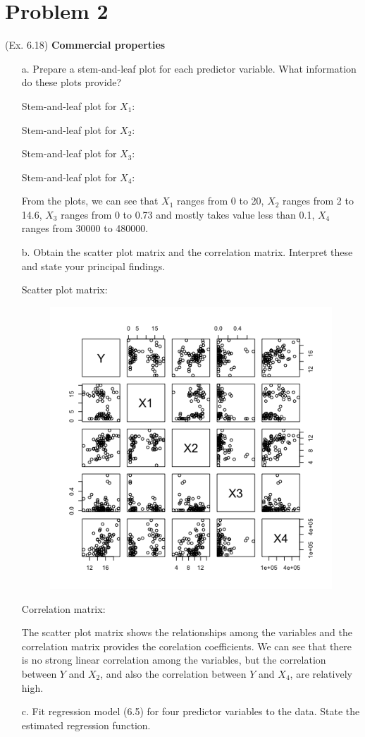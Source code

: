 \documentclass[10pt]{report}
\begin{document}
\section*{Problem 2}
(Ex. 6.18) \textbf{Commercial properties}
\begin{enumerate}
	\item [a.]
	Prepare a stem-and-leaf plot for each predictor variable. What information do these plots provide?
	
	Stem-and-leaf plot for $X_1$:
	
	Stem-and-leaf plot for $X_2$:
	
	Stem-and-leaf plot for $X_3$:
	
	Stem-and-leaf plot for $X_4$:
	
	From the plots, we can see that $X_1$ ranges from 0 to 20, $X_2$ ranges from 2 to 14.6, $X_3$ ranges from 0 to 0.73 and mostly takes value less than 0.1, $X_4$ ranges from 30000 to 480000.
	
	\item [b.]
	Obtain the scatter plot matrix and the correlation matrix. Interpret these and state your principal findings.
	
	Scatter plot matrix:
	\begin{figure}[H]
		\centering
		\includegraphics[width=.65\linewidth]{p2/18b.png}
	\end{figure}
	Correlation matrix:
	
	The scatter plot matrix shows the relationships among the variables and the correlation matrix provides the corelation coefficients. We can see that there is no strong linear correlation among the variables, but the correlation between $Y$ and $X_2$, and also the correlation between $Y$ and $X_4$, are relatively high.
	
	\item [c.]
	Fit regression model (6.5) for four predictor variables to the data. State the estimated regression function. 
	

\end{enumerate}
\end{document}
